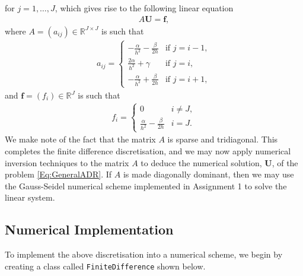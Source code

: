 \documentclass[a4paper,11pt]{article}
\theoremstyle{break}
\theoremstyle{break2}
\theoremstyle{break}
\theoremstyle{break2}
\newcommand{\R}{\mathbb{R}}
\begin{document}
for $ j = 1, \ldots, J $, which gives rise to the following linear equation
\begin{align}\label{Eq:LinearSystem}
A\mathbf{U} = \mathbf{f},
\end{align}
where $ A = (a_{ij}) \in \R^{J \times J} $ is such that
\begin{align*}
a_{ij} =
\begin{cases}
-\frac{\alpha}{h^2} - \frac{\beta}{2h} & \text{if } j = i-1, \\
\frac{2\alpha}{h^2} + \gamma & \text{if } j = i, \\
-\frac{\alpha}{h^2} + \frac{\beta}{2h} & \text{if } j = i+1,
\end{cases}
\end{align*}
and $ \mathbf{f} = (f_i) \in \R^{J} $ is such that 
\begin{align*}
f_i =
\begin{cases}
0 & i \neq J, \\
\frac{\alpha}{h^2} - \frac{\beta}{2h} & i = J.
\end{cases}
\end{align*}
We make note of the fact that the matrix $ A $ is sparse and tridiagonal. This completes the finite difference discretisation, and we may now apply numerical inversion techniques to the matrix $ A $ to deduce the numerical solution, $ \mathbf{U} $, of the problem \eqref{Eq:GeneralADR}. If $ A $ is made diagonally dominant, then we may use the Gauss-Seidel numerical scheme implemented in Assignment 1 to solve the linear system. 

\subsection{Numerical Implementation}
To implement the above discretisation into a numerical scheme, we begin by creating a class called \texttt{FiniteDifference} shown below.
\end{document}
